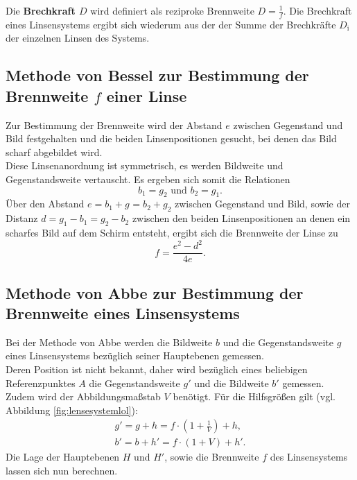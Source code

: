 Die \textbf{Brechkraft $D$} wird definiert als reziproke Brennweite $D=\frac{1}{f}$. Die Brechkraft eines Linsensystems ergibt sich wiederum aus der der Summe der Brechkräfte $D_{\mathrm{i}}$ der einzelnen Linsen des Systems.
\FloatBarrier
\subsection{Methode von Bessel zur Bestimmung der Brennweite $f$ einer Linse}
Zur Bestimmung der Brennweite wird der Abstand $e$ zwischen Gegenstand und Bild festgehalten und die beiden Linsenpositionen gesucht, bei denen das Bild scharf abgebildet wird.\\
Diese Linsenanordnung ist symmetrisch, es werden Bildweite und Gegenstandsweite vertauscht.
Es ergeben sich somit die Relationen
\begin{equation}
b_{\mathrm{1}}=g_{\mathrm{2}} \text{ und } b_{\mathrm{2}}=g_{\mathrm{1}} \text{.}
\end{equation}
Über den Abstand $e=b_{\mathrm{1}}+g_{\mathrm{}}=b_{\mathrm{2}}+g_{\mathrm{2}} $ zwischen Gegenstand und Bild, sowie der Distanz $d=g_{\mathrm{1}}-b_{\mathrm{1}}=g_{\mathrm{2}}-b_{\mathrm{2}}$ zwischen den beiden Linsenpositionen an denen ein scharfes Bild auf dem Schirm entsteht,
ergibt sich die Brennweite der Linse zu
\begin{equation}
  \label{eqn:nochmalbessel}
  f=\frac{e^2-d^2}{4e}\text{.}
\end{equation}

\subsection{Methode von Abbe zur Bestimmung der Brennweite eines Linsensystems}
Bei der Methode von Abbe werden die Bildweite $b$ und die Gegenstandsweite $g$ eines Linsensystems bezüglich seiner Hauptebenen gemessen.
\\Deren Position ist nicht bekannt, daher wird bezüglich eines beliebigen Referenzpunktes $A$ die Gegenstandsweite $g'$ und die Bildweite $b'$ gemessen.
\\Zudem wird der Abbildungsmaßstab $V$ benötigt.
Für die Hilfsgrößen gilt (vgl. Abbildung \ref{fig:lensesystemlol}):
\begin{gather}
  \label{eqn:abbe}
  g'=g+h=f\cdot\left(1+\frac{1}{V}\right)+h \text{,}\\
  b'=b+h'=f\cdot\left(1+V\right)+h' \text{.}
\end{gather}
Die Lage der Hauptebenen $H$ und $H'$, sowie die Brennweite $f$ des Linsensystems lassen sich nun berechnen.
